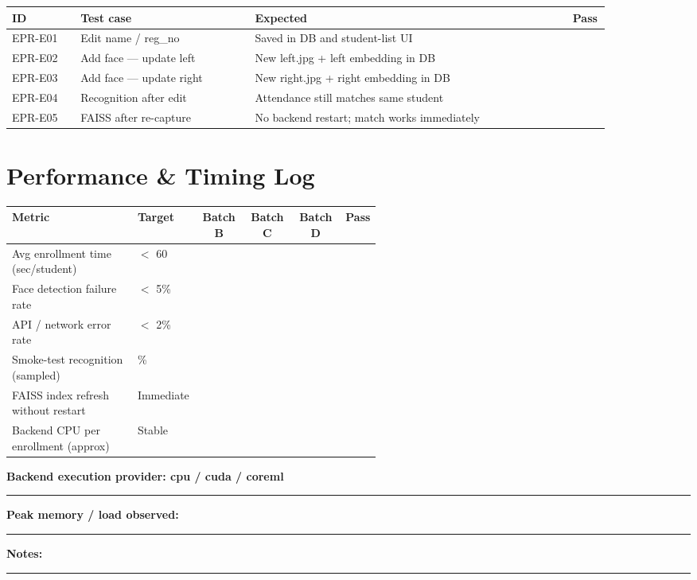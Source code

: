 \documentclass[11pt,a4paper,oneside]{article}
\newcommand{\chk}{\fbox{\rule{0pt}{0.95ex}\rule{0.95ex}{0pt}}}
\newcommand{\fillin}[1][3cm]{\rule{#1}{0.4pt}}
\newcommand{\fillinlong}{\rule{0.72\textwidth}{0.4pt}}
\newcommand{\notesblock}{\par\smallskip\noindent\textbf{Notes:}\ \fillinlong\par\smallskip}
\newcommand{\fieldline}[1]{\par\smallskip\noindent\textbf{#1}\ \fillin\par}
\newcommand{\tcheadfour}{%
  \toprule
  \textbf{ID} & \textbf{Test case} & \textbf{Expected} & \textbf{Pass} \\
  \midrule
}
\begin{document}
\small
\begin{tabular}{@{}>{\raggedright\arraybackslash}p{0.11\linewidth} >{\raggedright\arraybackslash}p{0.28\linewidth} >{\raggedright\arraybackslash}p{0.51\linewidth} >{\centering\arraybackslash}p{0.06\linewidth}@{}}
  \tcheadfour
  EPR-E01 & Edit name / reg\_no     & Saved in DB and student-list UI           & \chk \\
  EPR-E02 & Add face — update left  & New left.jpg + left embedding in DB       & \chk \\
  EPR-E03 & Add face — update right & New right.jpg + right embedding in DB     & \chk \\
  EPR-E04 & Recognition after edit& Attendance still matches same student     & \chk \\
  EPR-E05 & FAISS after re-capture  & No backend restart; match works immediately & \chk \\
  \bottomrule
\end{tabular}
\normalsize

\section{Performance \& Timing Log}

\small
\begin{tabular}{@{}>{\raggedright\arraybackslash}p{0.34\linewidth} >{\raggedright\arraybackslash}p{0.14\linewidth} c c c >{\centering\arraybackslash}p{0.06\linewidth}@{}}
  \toprule
  \textbf{Metric} & \textbf{Target} & \textbf{Batch B} & \textbf{Batch C} & \textbf{Batch D} & \textbf{Pass} \\
  \midrule
  Avg enrollment time (sec/student) & $<$ 60       & & & & \chk \\
  Face detection failure rate       & $<$ 5\%      & & & & \chk \\
  API / network error rate          & $<$ 2\%      & & & & \chk \\
  Smoke-test recognition (sampled)  & 100\%        & & & & \chk \\
  FAISS index refresh without restart & Immediate  & & & & \chk \\
  Backend CPU per enrollment (approx) & Stable     & & & & \chk \\
  \bottomrule
\end{tabular}
\normalsize

\fieldline{Backend execution provider: cpu / cuda / coreml}
\fieldline{Peak memory / load observed:}
\notesblock
\end{document}
